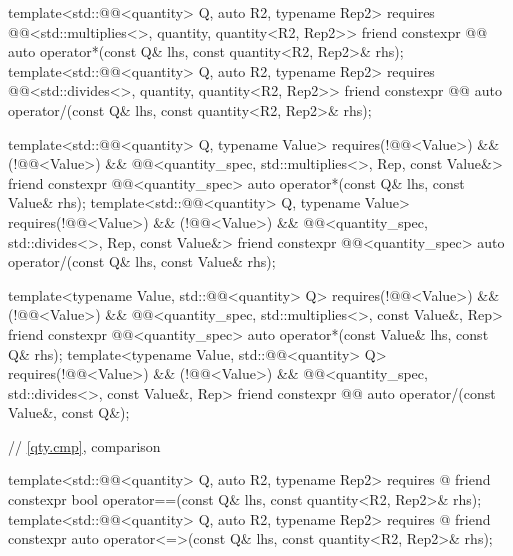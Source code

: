 \begin{codeblock}
{{  template<std::@@<quantity> Q, auto R2, typename Rep2>
    requires @@<std::multiplies<>, quantity, quantity<R2, Rep2>>
  friend constexpr @@ auto operator*(const Q& lhs, const quantity<R2, Rep2>& rhs);
  template<std::@@<quantity> Q, auto R2, typename Rep2>
    requires @@<std::divides<>, quantity, quantity<R2, Rep2>>
  friend constexpr @@ auto operator/(const Q& lhs, const quantity<R2, Rep2>& rhs);

  template<std::@@<quantity> Q, typename Value>
    requires(!@@<Value>) && (!@@<Value>) &&
            @@<quantity_spec, std::multiplies<>, Rep, const Value&>
  friend constexpr @@<quantity_spec> auto operator*(const Q& lhs, const Value& rhs);
  template<std::@@<quantity> Q, typename Value>
    requires(!@@<Value>) && (!@@<Value>) &&
            @@<quantity_spec, std::divides<>, Rep, const Value&>
  friend constexpr @@<quantity_spec> auto operator/(const Q& lhs, const Value& rhs);

  template<typename Value, std::@@<quantity> Q>
    requires(!@@<Value>) && (!@@<Value>) &&
            @@<quantity_spec, std::multiplies<>, const Value&, Rep>
  friend constexpr @@<quantity_spec> auto operator*(const Value& lhs, const Q& rhs);
  template<typename Value, std::@@<quantity> Q>
    requires(!@@<Value>) && (!@@<Value>) &&
            @@<quantity_spec, std::divides<>, const Value&, Rep>
  friend constexpr @@ auto operator/(const Value&, const Q&);

  // \ref{qty.cmp}, comparison

  template<std::@@<quantity> Q, auto R2, typename Rep2>
    requires @\seebelownc@
  friend constexpr bool operator==(const Q& lhs, const quantity<R2, Rep2>& rhs);
  template<std::@@<quantity> Q, auto R2, typename Rep2>
    requires @\seebelownc@
  friend constexpr auto operator<=>(const Q& lhs, const quantity<R2, Rep2>& rhs);

}}
\end{codeblock}
